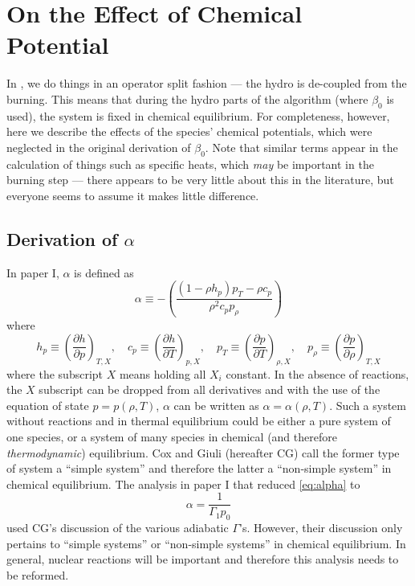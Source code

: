 \section{On the Effect of Chemical Potential}
\label{Sec:On the Affect of Chemical Potential}

In \maestro, we do things in an operator split fashion --- the hydro is
de-coupled from the burning.  This means that during the hydro parts
of the algorithm (where $\beta_0$ is used), the system is fixed in
chemical equilibrium. For completeness, however, here we describe the
effects of the species' chemical potentials, which were neglected in
the original derivation of $\beta_0$.  Note that similar terms appear
in the calculation of things such as specific heats,
which \textit{may} be important in the burning step --- there appears to
be very little about this in the literature, but everyone seems to
assume it makes little difference.

\subsection{Derivation of $\alpha$}
\label{Sec:Derivation of alpha}
In paper I, $\alpha$ is defined as
\begin{equation}\label{eq:alpha}
\alpha\equiv -\left(
\frac{(1-\rho h_p)p_T-\rho c_p}{\rho^2c_pp_\rho}\right)
\end{equation}
where 
\[
h_p \equiv \left(\frac{\partial h}{\partial p}\right)_{T,X}, \quad
c_p \equiv \left(\frac{\partial h}{\partial T}\right)_{p,X}, \quad
p_T \equiv \left(\frac{\partial p}{\partial T}\right)_{\rho,X}, \quad
p_\rho \equiv \left(\frac{\partial p}{\partial \rho}\right)_{T,X}
\]
where the subscript $X$ means holding all $X_i$ constant.  In the
absence of reactions, the $X$ subscript can be dropped from all
derivatives and with the use of the equation of state $p=p(\rho,T)$,
$\alpha$ can be written as $\alpha=\alpha(\rho,T)$.  Such a system
without reactions and in thermal equilibrium could be either a pure
system of one species, or a system of many species in chemical (and
therefore \emph{thermodynamic}) equilibrium.  Cox and Giuli (hereafter
CG) call the former type of system a ``simple system'' and therefore
the latter a ``non-simple system'' in chemical equilibrium.  The
analysis in paper I that reduced \eqref{eq:alpha} to
\begin{equation}\label{eq:alpha_simp_no_rxn} 
\alpha = \frac{1}{\Gamma_1p_0} 
\end{equation} 
used CG's discussion of the various adiabatic $\Gamma$'s.  However,
their discussion only pertains to ``simple systems'' or ``non-simple
systems'' in chemical equilibrium.  In general, nuclear reactions will
be important and therefore this analysis needs to be reformed.


